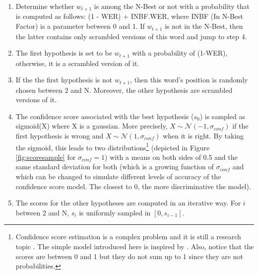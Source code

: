 					\begin{enumerate}
						\item Determine whether $w_{t+1}$ is among the N-Best or not with a probability that is computed as follows: (1 - WER) + INBF.WER, where INBF (In N-Best Factor) is a parameter between 0 and 1. If $w_{t+1}$ is not in the N-Best, then the latter contains only scrambled versions of this word and jump to step 4.
							\item The first hypothesis is set to be $w_{t+1}$ with a probability of (1-WER), otherwise, it is a scrambled version of it.
							\item If the the first hypothesis is not $w_{t+1}$, then this word's position is randomly chosen between 2 and N. Moreover, the other hypothesis are scrambled versions of it.
							\item The confidence score associated with the best hypothesis ($s_0$) is sampled as sigmoid(X) where X is a gaussian. More precisely, $X \sim \mathcal{N} (-1,\sigma_{conf})$ if the first hypothesis is wrong and $X \sim \mathcal{N} (1,\sigma_{conf})$ when it is right. By taking the sigmoid, this leads to two distributions\footnote{Confidence score estimation is a complex problem and it is still a research topic \cite{Jiang2005,Seigel2011}. The simple model introduced here is inspired by \cite{Pietquin2005}. Also, notice that the scores are between 0 and 1 but they do not sum up to 1 since they are not probabilities.} (depicted in Figure \ref{fig:scoresample} for $\sigma_{conf} = 1$) with a means on both sides of 0.5 and the same standard deviation for both (which is a growing function of $\sigma_{conf}$ and which can be changed to simulate different levels of accuracy of the confidence score model. The closest to 0, the more discriminative the model).
							\item The scores for the other hypotheses are computed in an iterative way. For $i$ between 2 and N, $s_i$ is uniformly sampled in $[0,s_{i-1}]$.
					\end{enumerate}
					
					
